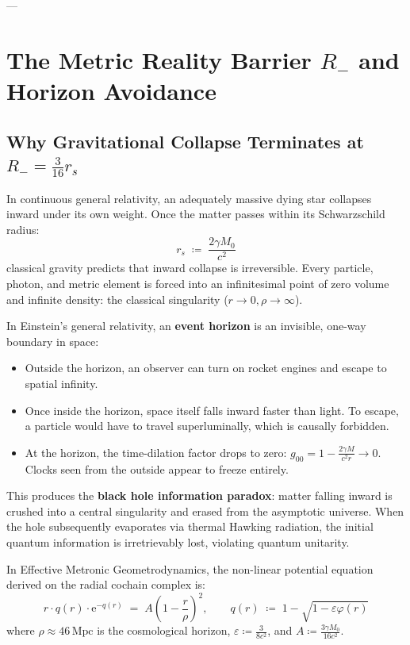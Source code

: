 \documentclass[
    12pt,
    a4paper,
    headings=normal,
    twoside=false,
    open=any,
    parskip=half
]{scrbook}
\newcommand{\eu}{\mathrm{e}}
\begin{document}
---

\section{The Metric Reality Barrier $R_-$ and Horizon Avoidance}
\label{sec:ch9_reality_barrier_horizon_avoidance}

\subsection{Why Gravitational Collapse Terminates at $R_- = \frac{3}{16}r_s$}

In continuous general relativity, an adequately massive dying star collapses inward under its own weight. Once the matter passes within its Schwarzschild radius:
\begin{equation}
r_s \;\coloneqq\; \frac{2\gamma M_0}{c^2}
\label{eq:ch9_schwarzschild_radius_def}
\end{equation}
classical gravity predicts that inward collapse is irreversible. Every particle, photon, and metric element is forced into an infinitesimal point of zero volume and infinite density: the classical singularity ($r \to 0, \rho \to \infty$).

\begin{intuitionbox}
In Einstein's general relativity, an \textbf{event horizon} is an invisible, one-way boundary in space:
\begin{itemize}[leftmargin=1.5em]
    \item Outside the horizon, an observer can turn on rocket engines and escape to spatial infinity.
    \item Once inside the horizon, space itself falls inward faster than light. To escape, a particle would have to travel superluminally, which is causally forbidden.
    \item At the horizon, the time-dilation factor drops to zero: $g_{00} = 1 - \frac{2\gamma M}{c^2 r} \to 0$. Clocks seen from the outside appear to freeze entirely.
\end{itemize}
This produces the \textbf{black hole information paradox}: matter falling inward is crushed into a central singularity and erased from the asymptotic universe. When the hole subsequently evaporates via thermal Hawking radiation, the initial quantum information is irretrievably lost, violating quantum unitarity.
\end{intuitionbox}

In Effective Metronic Geometrodynamics, the non-linear potential equation derived on the radial cochain complex is:
\begin{equation}
r \cdot q(r) \cdot \eu^{-q(r)} \;=\; A \left( 1 - \frac{r}{\rho} \right)^2, \qquad q(r) \;\coloneqq\; 1 - \sqrt{1 - \varepsilon \varphi(r)}
\label{eq:ch9_transcendental_potential}
\end{equation}
where $\rho \approx 46\,\text{Mpc}$ is the cosmological horizon, $\varepsilon \coloneqq \frac{3}{8c^2}$, and $A \coloneqq \frac{3\gamma M_0}{16c^2}$.
\end{document}
